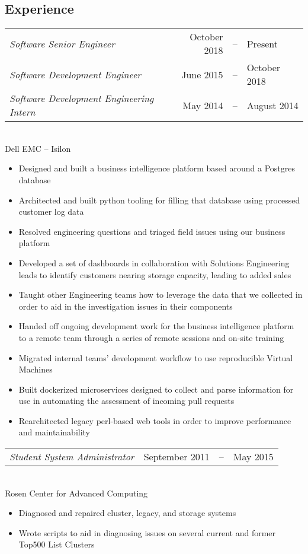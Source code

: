\documentclass[line,margin]{res}
\begin{document}
\begin{resume}
  \section{\textcolor{TealBlue}{Experience}} 
    \begin{tabular}{@{} p{} r c l @{}}
      {\sl Software Senior Engineer\/} & October 2018 & -- & Present \\%
      {\sl Software Development Engineer\/} & June 2015 & -- & October 2018 \\%
      {\sl Software Development Engineering Intern\/} & May 2014 & -- & August 2014 \\%
    \end{tabular} \\
      Dell EMC -- Isilon %
      \begin{itemize} 
	\setlength{\itemsep}{-2pt}
        \item Designed and built a business intelligence platform based around a Postgres database
        \item Architected and built python tooling for filling that database using processed customer log data
        \item Resolved engineering questions and triaged field issues using our business platform
        \item Developed a set of dashboards in collaboration with Solutions Engineering leads to identify customers nearing storage capacity, leading to added sales
        \item Taught other Engineering teams how to leverage the data that we collected in order to aid in the investigation issues in their components
        \item Handed off ongoing development work for the business intelligence platform to a remote team through a series of remote sessions and on-site training
        \item Migrated internal teams' development workflow to use reproducible Virtual Machines
	\item Built dockerized microservices designed to collect and parse information for use in automating the assessment of incoming pull requests
	\item Rearchitected legacy perl-based web tools in order to improve performance and maintainability
      \end{itemize}

    \begin{tabular}{@{} p{} r c l @{}}
      {\sl Student System Administrator\/} \hfill & September 2011 & -- & May 2015 %
    \end{tabular} \\
      Rosen Center for Advanced Computing
      \begin{itemize}
	\setlength{\itemsep}{-2pt}
        \item Diagnosed and repaired cluster, legacy, and storage systems
        \item Wrote scripts to aid in diagnosing issues on several current and former Top500 List Clusters
      \end{itemize}


\end{resume}
\end{document}
